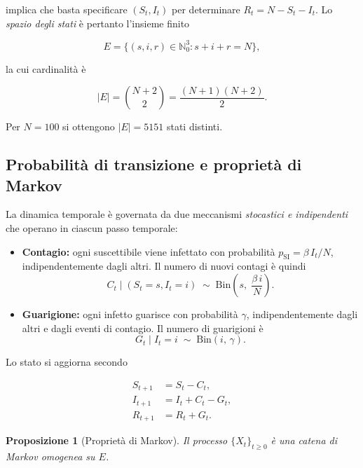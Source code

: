 \documentclass[11pt, a4paper]{article}
\theoremstyle{plain}
\newtheorem{proposition}[theorem]{Proposizione}
\theoremstyle{definition}
\theoremstyle{remark}
\newcommand{\N}{\mathbb{N}}
\begin{document}
implica che basta specificare $(S_t, I_t)$ per determinare $R_t = N - S_t - I_t$.
Lo \emph{spazio degli stati} è pertanto l'insieme finito

\begin{equation}\label{eq:spazio_stati}
  E = \bigl\{(s,i,r) \in \N_0^3 : s + i + r = N\bigr\},
\end{equation}

la cui cardinalità è

\[
  |E| = \binom{N+2}{2} = \frac{(N+1)(N+2)}{2}.
\]

Per $N = 100$ si ottengono $|E| = 5151$ stati distinti.

\subsection{Probabilità di transizione e proprietà di Markov}

La dinamica temporale è governata da due meccanismi \emph{stocastici e indipendenti}
che operano in ciascun passo temporale:

\begin{itemize}[leftmargin=2em]
  \item \textbf{Contagio:} ogni suscettibile viene infettato con probabilità
    $p_{\mathrm{SI}} = \beta\, I_t / N$, indipendentemente dagli altri.
    Il numero di nuovi contagi è quindi
    \[
      C_t \mid (S_t = s, I_t = i) \;\sim\; \mathrm{Bin}\!\left(s,\; \frac{\beta\, i}{N}\right).
    \]

  \item \textbf{Guarigione:} ogni infetto guarisce con probabilità $\gamma$,
    indipendentemente dagli altri e dagli eventi di contagio.
    Il numero di guarigioni è
    \[
      G_t \mid I_t = i \;\sim\; \mathrm{Bin}(i,\, \gamma).
    \]
\end{itemize}

Lo stato si aggiorna secondo

\begin{equation}\label{eq:aggiornamento}
  \begin{aligned}
    S_{t+1} &= S_t - C_t,\\
    I_{t+1} &= I_t + C_t - G_t,\\
    R_{t+1} &= R_t + G_t.
  \end{aligned}
\end{equation}

\begin{proposition}[Proprietà di Markov]
  Il processo $\{X_t\}_{t \geq 0}$ è una catena di Markov omogenea su $E$.
\end{proposition}
\end{document}
